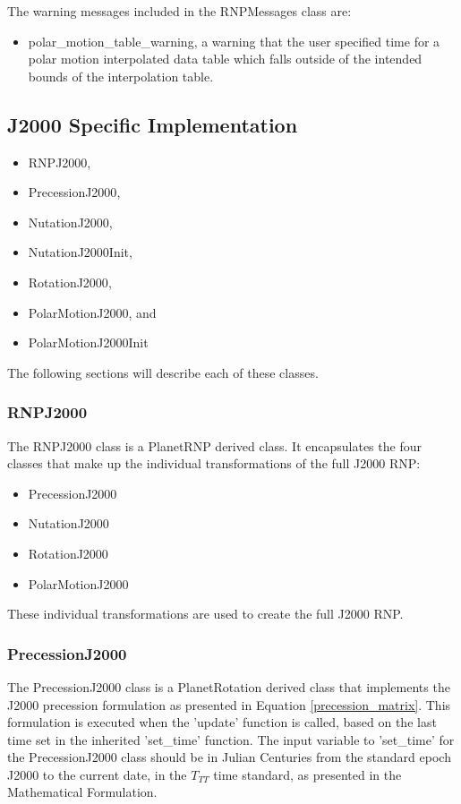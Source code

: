 The warning messages included in the RNPMessages class are:

\begin{itemize}
\item{polar\_motion\_table\_warning}, a warning that the user specified
time for a polar motion interpolated data table which falls outside of the intended
bounds of the interpolation table.
\end{itemize}

\subsection{J2000 Specific Implementation}

\begin{itemize}
\item{RNPJ2000},
\item{PrecessionJ2000},
\item{NutationJ2000},
\item{NutationJ2000Init},
\item{RotationJ2000},
\item{PolarMotionJ2000}, and
\item{PolarMotionJ2000Init}
\end{itemize}

The following sections will describe each of these classes.

\subsubsection{RNPJ2000}

The RNPJ2000 class is a PlanetRNP derived class. It encapsulates the four
classes that make up the individual transformations of the full J2000 RNP:

\begin{itemize}
\item{PrecessionJ2000}
\item{NutationJ2000}
\item{RotationJ2000}
\item{PolarMotionJ2000}
\end{itemize}

These individual transformations are used to create the full J2000 RNP.

\subsubsection{PrecessionJ2000}

The PrecessionJ2000 class is a PlanetRotation derived class that implements the
J2000 precession formulation as presented in Equation \eqref{precession_matrix}.
This formulation is executed when the 'update' function is called, based
on the last time set in the inherited 'set\_time' function. The input
variable to 'set\_time' for the PrecessionJ2000 class should be in
Julian Centuries from the standard epoch J2000 to the current date, in the
$T_{TT}$ time standard, as presented in the Mathematical Formulation.

